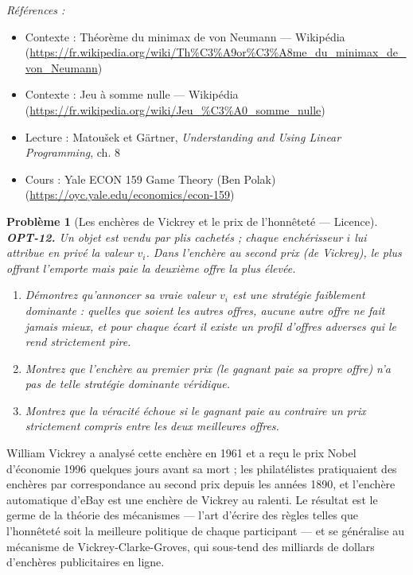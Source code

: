 \documentclass[11pt]{article}
\newtheorem{problem}{Problème}
\newenvironment{refs}{\par\small\noindent\emph{Références :}\begin{itemize}\setlength\itemsep{0pt}}{\end{itemize}\normalsize}
\begin{document}
\begin{refs}
\item Contexte : Théorème du minimax de von Neumann --- Wikipédia (\url{https://fr.wikipedia.org/wiki/Th%C3%A9or%C3%A8me_du_minimax_de_von_Neumann})
\item Contexte : Jeu à somme nulle --- Wikipédia (\url{https://fr.wikipedia.org/wiki/Jeu_%C3%A0_somme_nulle})
\item Lecture : Matou\v{s}ek et Gärtner, \textit{Understanding and Using Linear Programming}, ch. 8
\item Cours : Yale ECON 159 Game Theory (Ben Polak) (\url{https://oyc.yale.edu/economics/econ-159})
\end{refs}

\bigskip

\begin{problem}[{Les enchères de Vickrey et le prix de l'honnêteté --- Licence}]
\textbf{OPT-12.} Un objet est vendu par plis cachetés ; chaque enchérisseur $i$ lui attribue en privé la valeur $v_i$. Dans l'enchère au second prix (de Vickrey), le plus offrant l'emporte mais paie la deuxième offre la plus élevée.
\begin{enumerate}
\item[(a)] Démontrez qu'annoncer sa vraie valeur $v_i$ est une stratégie faiblement dominante : quelles que soient les autres offres, aucune autre offre ne fait jamais mieux, et pour chaque écart il existe un profil d'offres adverses qui le rend strictement pire.
\item[(b)] Montrez que l'enchère au premier prix (le gagnant paie sa propre offre) n'a pas de telle stratégie dominante véridique.
\item[(c)] Montrez que la véracité échoue si le gagnant paie au contraire un prix strictement compris entre les deux meilleures offres.
\end{enumerate}

\end{problem}

\noindent William Vickrey a analysé cette enchère en 1961 et a reçu le prix Nobel d'économie 1996 quelques jours avant sa mort ; les philatélistes pratiquaient des enchères par correspondance au second prix depuis les années 1890, et l'enchère automatique d'eBay est une enchère de Vickrey au ralenti. Le résultat est le germe de la théorie des mécanismes --- l'art d'écrire des règles telles que l'honnêteté soit la meilleure politique de chaque participant --- et se généralise au mécanisme de Vickrey-Clarke-Groves, qui sous-tend des milliards de dollars d'enchères publicitaires en ligne.
\end{document}
